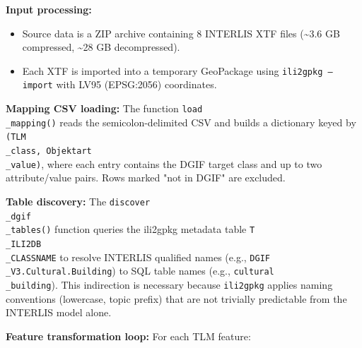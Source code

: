\documentclass[conference]{IEEEtran}
\begin{document}
\textbf{Input processing:}
\begin{itemize}[leftmargin=*]
\item Source data is a ZIP archive containing 8 INTERLIS XTF files (\textasciitilde{}3.6 GB compressed, \textasciitilde{}28 GB decompressed).
\item Each XTF is imported into a temporary GeoPackage using \texttt{ili2gpkg --import} with LV95 (EPSG:2056) coordinates.
\end{itemize}

\textbf{Mapping CSV loading:}
The function \texttt{load\\_mapping()} reads the semicolon-delimited CSV and builds a dictionary keyed by \texttt{(TLM\\_class, Objektart\\_value)}, where each entry contains the DGIF target class and up to two attribute/value pairs. Rows marked "not in DGIF" are excluded.

\textbf{Table discovery:}
The \texttt{discover\\_dgif\\_tables()} function queries the ili2gpkg metadata table \texttt{T\\_ILI2DB\\_CLASSNAME} to resolve INTERLIS qualified names (e.g., \texttt{DGIF\\_V3.Cultural.Building}) to SQL table names (e.g., \texttt{cultural\\_building}). This indirection is necessary because \texttt{ili2gpkg} applies naming conventions (lowercase, topic prefix) that are not trivially predictable from the INTERLIS model alone.

\textbf{Feature transformation loop:}
For each TLM feature:
\end{document}
